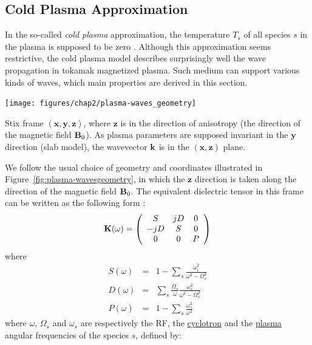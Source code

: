 \subsection{Cold Plasma Approximation}
In the so-called \textit{cold plasma} approximation, the temperature $T_s$ of all species $s$ in the plasma is supposed to be zero \cite[chap.5]{Brambilla1998}. Although this approximation seems restrictive, the cold plasma model describes surprisingly well the wave propagation in tokamak magnetized plasma. Such medium can support various kinds of waves, which main properties are derived in this section. 
\begin{marginfigure}
	\centering
	\texttt{[image: figures/chap2/plasma-waves\_geometry]}
	\caption{Stix frame $(\mathbf{x},\mathbf{y},\mathbf{z})$, where $\mathbf{z}$ is in the direction of anisotropy (the direction of the magnetic field ${\mathbf B}_0$). As plasma parameters are supposed invariant in the $\mathbf{y}$ direction (slab model), the wavevector ${\mathbf k}$ is in the $(\mathbf{x},\mathbf{z})$ plane. }
	\label{fig:plasma-wavesgeometry}
\end{marginfigure}
We follow the usual choice of geometry and coordinates illustrated in Figure~\ref{fig:plasma-wavesgeometry}, in which the $\mathbf{z}$ direction is taken along the direction of the magnetic field ${\mathbf B}_0$.  The equivalent dielectric tensor in this frame can be written as the following form :
\begin{equation}
{\mathbf K}(\omega)
=
\left(\begin{array}{ccc}
	S & j D & 0\\
	-j D & S & 0\\
	0 & 0 & P
\end{array}\right)
\label{eq:stix_K}
\end{equation}
where
\begin{subequations}
	\begin{eqnarray}
	S(\omega) 
	& = & 
	1-\sum_{s}\frac{\omega_{i}^{2}}{\omega^{2}-\Omega_{s}^{2}}
	\label{eq:stix_S}
	\\
	D(\omega) 
	& = & 
	\sum_{s}\frac{\Omega_{s}}{\omega}\frac{\omega_{s}^{2}}{\omega^{2}-\Omega_{s}^{2}}
	\label{eq:stix_D}
	\\
	P(\omega) 
	& = & 
	1-\sum_{s}\frac{\omega_{s}^{2}}{\omega^{2}}
	\label{eq:stix_P}
	\end{eqnarray}
	\label{eq:stix_SDP}
\end{subequations}
where $\omega$, $\Omega_{s}$ and $\omega_{s}$ are respectively the RF, the \href{http://docs.plasmapy.org/en/v0.1/api/plasmapy.physics.parameters.gyrofrequency.html}{cyclotron} and the \href{http://docs.plasmapy.org/en/v0.1/api/plasmapy.physics.parameters.plasma_frequency.html#plasmapy.physics.parameters.plasma_frequency}{plasma} angular frequencies of the species $s$, defined by:
